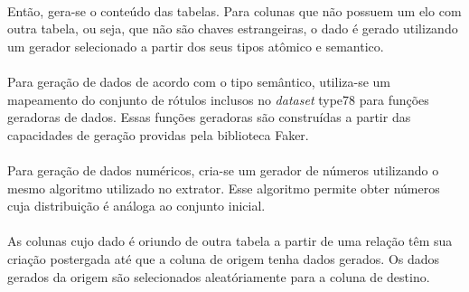 \paragraph{} Então, gera-se o conteúdo das tabelas. Para colunas que não possuem um elo com outra tabela, ou seja, que não são chaves estrangeiras, o dado é gerado utilizando um gerador selecionado a partir dos seus tipos atômico e semantico.

\paragraph{} Para geração de dados de acordo com o tipo semântico, utiliza-se um mapeamento do conjunto de rótulos inclusos no \textit{dataset} type78 para funções geradoras de dados. Essas funções geradoras são construídas a partir das capacidades de geração providas pela biblioteca Faker.

\paragraph{} Para geração de dados numéricos, cria-se um gerador de números utilizando o mesmo algoritmo utilizado no extrator. Esse algoritmo permite obter números cuja distribuição é análoga ao conjunto inicial.

\paragraph{} As colunas cujo dado é oriundo de outra tabela a partir de uma relação têm sua criação postergada até que a coluna de origem tenha dados gerados. Os dados gerados da origem são selecionados aleatóriamente para a coluna de destino.